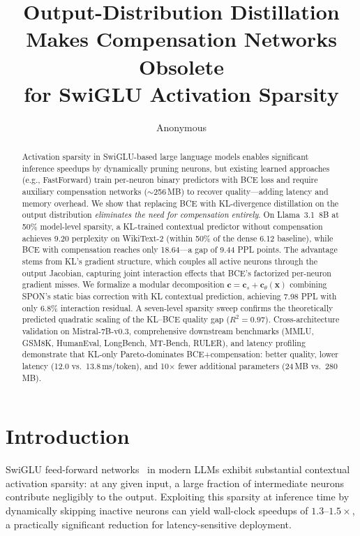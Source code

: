 \documentclass[11pt,a4paper]{article}
\title{Output-Distribution Distillation Makes Compensation Networks Obsolete\\for SwiGLU Activation Sparsity}
\author{Anonymous}
\begin{document}
\maketitle

\begin{abstract}
Activation sparsity in SwiGLU-based large language models enables significant inference speedups by dynamically pruning neurons, but existing learned approaches (e.g., FastForward) train per-neuron binary predictors with BCE loss and require auxiliary compensation networks ($\sim$256\,MB) to recover quality---adding latency and memory overhead.
We show that replacing BCE with KL-divergence distillation on the output distribution \emph{eliminates the need for compensation entirely}.
On Llama~3.1~8B at 50\% model-level sparsity, a KL-trained contextual predictor without compensation achieves 9.20 perplexity on WikiText-2 (within 50\% of the dense 6.12 baseline), while BCE with compensation reaches only 18.64---a gap of 9.44 PPL points.
The advantage stems from KL's gradient structure, which couples all active neurons through the output Jacobian, capturing joint interaction effects that BCE's factorized per-neuron gradient misses.
We formalize a modular decomposition $\mathbf{c} = \mathbf{c}_s + \mathbf{c}_\theta(\mathbf{x})$ combining SPON's static bias correction with KL contextual prediction, achieving 7.98 PPL with only 6.8\% interaction residual.
A seven-level sparsity sweep confirms the theoretically predicted quadratic scaling of the KL--BCE quality gap ($R^2 = 0.97$).
Cross-architecture validation on Mistral-7B-v0.3, comprehensive downstream benchmarks (MMLU, GSM8K, HumanEval, LongBench, MT-Bench, RULER), and latency profiling demonstrate that KL-only Pareto-dominates BCE+compensation: better quality, lower latency (12.0 vs.\ 13.8\,ms/token), and 10$\times$ fewer additional parameters (24\,MB vs.\ 280\,MB).
\end{abstract}

\section{Introduction}

SwiGLU feed-forward networks~\cite{shazeer2020glu} in modern LLMs exhibit substantial contextual activation sparsity: at any given input, a large fraction of intermediate neurons contribute negligibly to the output.
Exploiting this sparsity at inference time by dynamically skipping inactive neurons can yield wall-clock speedups of $1.3$--$1.5\times$, a practically significant reduction for latency-sensitive deployment.
\end{document}
